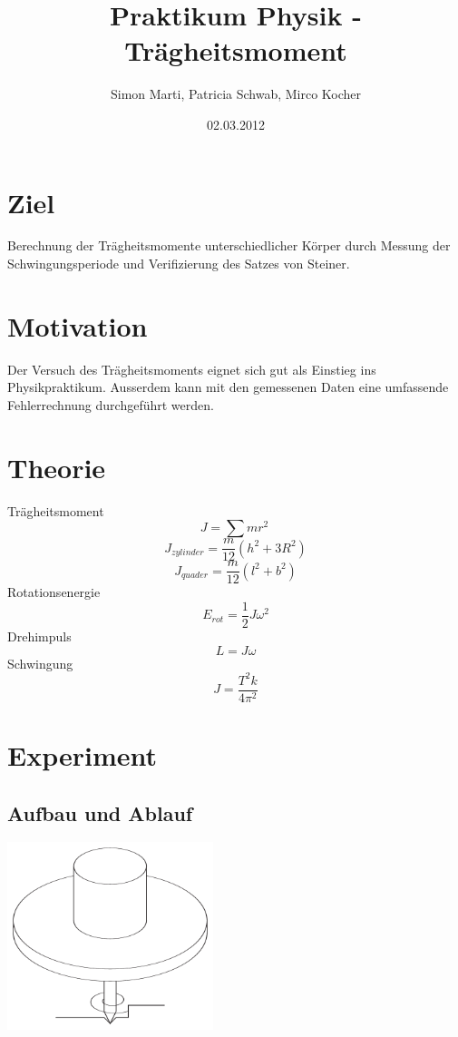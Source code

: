 \documentclass[12pt,a4paper]{article}
\title{Praktikum Physik - Tr\"agheitsmoment}
\author{Simon Marti, Patricia Schwab, Mirco Kocher}
\date{02.03.2012}
\begin{document}
\maketitle

\section*{Ziel}
 Berechnung der Tr\"agheitsmomente unterschiedlicher K\"orper durch Messung der Schwingungsperiode und Verifizierung des Satzes von Steiner.

\section*{Motivation}
Der Versuch des Tr\"agheitsmoments eignet sich gut als Einstieg ins Physikpraktikum. Ausserdem kann mit den gemessenen Daten eine umfassende Fehlerrechnung durchgef\"uhrt werden.

\section*{Theorie}

Tr\"agheitsmoment
\[  J = \sum mr^2\ \]
\[  J_{zylinder} = \frac{m}{12}(h^2 + 3R^2) \]
\[ J_{quader} = \frac{m}{12}(l^2 + b^2) \]
Rotationsenergie
\[ E_{rot} = \frac{1}{2}J\omega^2 \]
Drehimpuls
\[ L = J\omega \]
Schwingung
\[ J = \frac{T^2k}{4\pi^2} \]

\section*{Experiment}

\subsection*{Aufbau und Ablauf}
\includegraphics[width=6cm]{illustration11.pdf}
\end{document}
